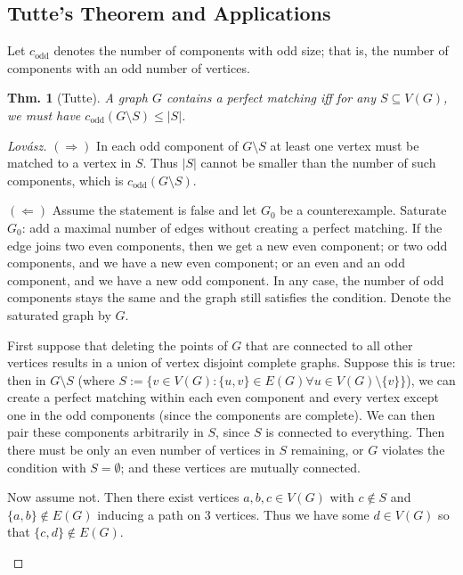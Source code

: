 \documentclass[12pt, a4paper]{book}
\newtheorem{theorem}{Thm.}[section]
\theoremstyle{nonumberplain}
\newtheorem{proof}{Proof}
\begin{document}
\subsection{Tutte's Theorem and Applications}
Let $c_{\text{odd}}$ denotes the number of components with odd size; that is, the number of components with an odd number of vertices.
\begin{theorem}[Tutte]
    A graph $G$ contains a perfect matching iff for any $S\subseteq V(G)$, we must have $c_{\text{odd}}(G\setminus S)\leq |S|$.
\end{theorem}
\begin{proof}[Lov\'asz]
    $(\Rightarrow)$ In each odd component of $G\setminus S$ at least one vertex must be matched to a vertex in $S$.
    Thus $|S|$ cannot be smaller than the number of such components, which is $c_{\text{odd}}(G\setminus S)$.

    $(\Leftarrow)$ Assume the statement is false and let $G_0$ be a counterexample.
    Saturate $G_0$: add a maximal number of edges without creating a perfect matching.
    If the edge joins two even components, then we get a new even component; or two odd components, and we have a new even component; or an even and an odd component, and we have a new odd component.
    In any case, the number of odd components stays the same and the graph still satisfies the condition.
    Denote the saturated graph by $G$.

    First suppose that deleting the points of $G$ that are connected to all other vertices results in a union of vertex disjoint complete graphs.
    Suppose this is true: then in $G\setminus S$ (where $S:=\{v\in V(G):\{u,v\}\in E(G)\forall u\in V(G)\setminus\{v\}\}$), we can create a perfect matching within each even component and every vertex except one in the odd components (since the components are complete).
    We can then pair these components arbitrarily in $S$, since $S$ is connected to everything.
    Then there must be only an even number of vertices in $S$ remaining, or $G$ violates the condition with $S=\emptyset$; and these vertices are mutually connected.

    Now assume not.
    Then there exist vertices $a,b,c\in V(G)$ with $c\notin S$ and $\{a,b\}\notin E(G)$ inducing a path on $3$ vertices.
    Thus we have some $d\in V(G)$ so that $\{c,d\}\notin E(G)$.
    \begin{center}
\end{center}
\end{proof}
\end{document}

